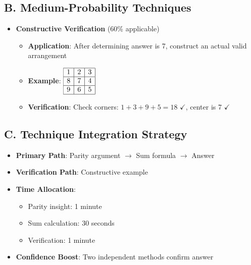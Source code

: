 \documentclass[11pt]{article}
\begin{document}
\begin{conversionbox}
\subsection*{B. Medium-Probability Techniques}
\begin{itemize}[leftmargin=*]
    \item \textbf{Constructive Verification} (60\% applicable)
    \begin{itemize}
        \item \textbf{Application}: After determining answer is 7, construct an actual valid arrangement
        \item \textbf{Example}: $\begin{array}{|c|c|c|}\hline 1 & 2 & 3 \\\hline 8 & 7 & 4 \\\hline 9 & 6 & 5 \\\hline\end{array}$
        \item \textbf{Verification}: Check corners: $1+3+9+5=18$ $\checkmark$, center is 7 $\checkmark$
    \end{itemize}
\end{itemize}

\subsection*{C. Technique Integration Strategy}
\begin{itemize}[leftmargin=*]
    \item \textbf{Primary Path}: Parity argument $\to$ Sum formula $\to$ Answer
    \item \textbf{Verification Path}: Constructive example
    \item \textbf{Time Allocation}: 
    \begin{itemize}
        \item Parity insight: 1 minute
        \item Sum calculation: 30 seconds
        \item Verification: 1 minute
    \end{itemize}
    \item \textbf{Confidence Boost}: Two independent methods confirm answer
\end{itemize}
\end{conversionbox}
\end{document}
